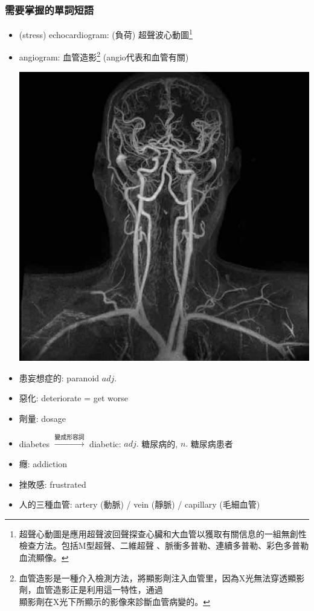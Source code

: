 \subsubsection*{需要掌握的單詞短語}
\begin{itemize}
  \itemsep0em
  \item (stress) echocardiogram: (負荷) 超聲波心動圖\footnote{超聲心動圖是應用超聲波回聲探查心臟和大血管以獲取有關信息的一組無創性檢查方法。包括M型超聲、二維超聲 、脈衝多普勒、連續多普勒、彩色多普勒血流顯像。}
  \item angiogram: 血管造影\footnote{血管造影是一種介入檢測方法，將顯影劑注入血管里，因為X光無法穿透顯影劑，血管造影正是利用這一特性，通過\\顯影劑在X光下所顯示的影像來診斷血管病變的。} (angio代表和血管有關)
  \begin{center}
    \includegraphics[scale=.3]{pics/angiogram}
  \end{center}
  \item 患妄想症的: paranoid $adj.$
  \item 惡化: deteriorate = get worse
  \item 劑量: dosage
  \item diabetes $\xrightarrow{\text{變成形容詞}}$ diabetic: $adj.$ 糖尿病的, $n.$ 糖尿病患者
  \item 癮: addiction
  \item 挫敗感: frustrated
  \item 人的三種血管: artery (動脈) / vein (靜脈) / capillary (毛細血管)
\end{itemize}

